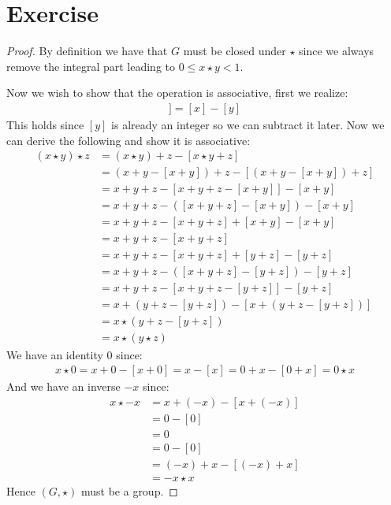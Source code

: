 \documentclass{article}
\begin{document}
\section{Exercise}
\begin{proof}
    By definition we have that $G$ must be closed under $\star$ since we always
    remove the integral part leading to $0 \leq x \star y < 1$.

    Now we wish to show that the operation is associative, first we realize:
    \begin{align*}
        [x - [y]] = [x] - [y] 
    \end{align*}
    This holds since $[y]$ is already an integer so we can subtract it later.
    Now we can derive the following and show it is associative:
    \begin{align*}
        (x \star y) \star z &= (x \star y) + z - [x \star y + z] \\
        &= (x + y - [x + y]) + z - [(x + y - [x + y]) + z] \\
        &= x + y + z - [x + y + z - [x + y]] - [x + y] \\
        &= x + y + z - ([x + y + z] - [x + y]) - [x + y] \\
        &= x + y + z - [x + y + z] + [x + y] - [x + y] \\
        &= x + y + z - [x + y + z] \\
        &= x + y + z - [x + y + z] + [y + z] - [y + z] \\
        &= x + y + z - ([x + y + z] - [y + z]) - [y + z] \\
        &= x + y + z - [x + y + z - [y + z]] - [y + z] \\
        &= x + (y + z - [y + z]) - [x + (y + z - [y + z])] \\
        &= x \star (y + z - [y + z]) \\
        &= x \star (y \star z) 
    \end{align*}
    We have an identity $0$ since:
    \begin{align*}
        x \star 0 = x + 0 - [x + 0] = x - [x] = 0 + x - [0 + x] = 0 \star x
    \end{align*}
    And we have an inverse $-x$ since:
    \begin{align*}
        x \star -x &= x + (-x) - [x + (-x)] \\
        &= 0 - [0] \\
        &= 0 \\
        &= 0 - [0] \\
        &= (-x) + x - [(-x) + x] \\
        &= -x \star x
    \end{align*}
    Hence $(G, \star)$ must be a group.
\end{proof}
\end{document}
